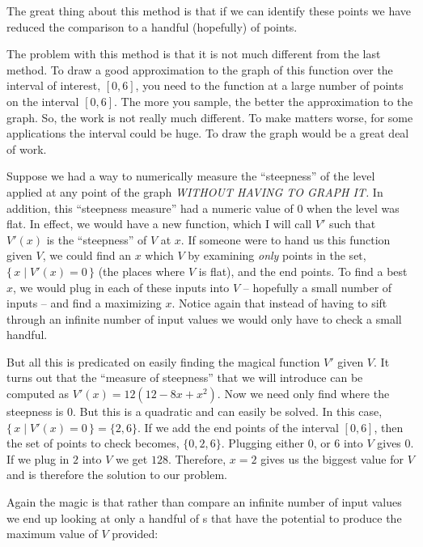 The great thing about this method is that if 
we can identify these points we have reduced the comparison to a handful
(hopefully) of points. 

The problem with this method is that it is not much different from the last 
method. To draw a good approximation to the graph of this function over the interval of interest, 
$[0,6]$, you need to  the function
at a large number of points on the interval $[0,6]$. The more you sample, the 
better the approximation to the graph. So, the work is not really much different. To make matters 
worse, for some applications the interval could be huge. To draw the graph 
would be a great deal of work.

Suppose we had a way to numerically measure the ``steepness'' 
of the level applied at any point of the graph 
{\it WITHOUT HAVING TO GRAPH IT.\/}
In addition, this ``steepness measure'' had a numeric value 
of $0$ when the level was flat. In effect, we would have a new function, 
which I will call $V'$ such that $V'(x)$ is the ``steepness'' of $V$ at $x$. 
If someone were 
to hand us this function given $V$, we could find an $x$ which 
$V$ by examining {\it only\/} points in the set, 
$\{\,x \mid  V'(x) = 0 \,\}$ (the places where $V$ is flat), and 
the end points.
To find a best $x$, we would plug in 
each of these inputs into $V$ -- hopefully a small number of inputs -- and 
find a maximizing $x$. Notice again that instead of having to sift through an 
infinite 
number of input values we would only have to check a small handful. 

But all this is predicated on easily finding the magical function $V'$ given 
$V$. It turns out that the ``measure of steepness'' that we will introduce can 
be computed as $V'(x) = 12 (12 - 8x + x^2)$. Now we need only find where the 
steepness is $0$. But this is a quadratic and can easily be solved. 
In this case, $\{ \, x \mid V'(x) = 0\, \} = \{2,6\}$. If we add the end 
points of the 
interval $[0,6]$, then the set of points to check becomes, $\{0,2,6\}$.
Plugging either $0$, or $6$ into $V$ gives $0$. If we plug 
in $2$ into $V$ we get $128$. Therefore, $x = 2$ gives us the 
biggest value for $V$ 
and is therefore the solution to our problem.

Again the magic is that rather than compare an infinite number of input values 
we end up looking at only a handful of s 
that have the potential to produce the maximum value of $V$ provided:

\beginEnum
{}
\endEnum

